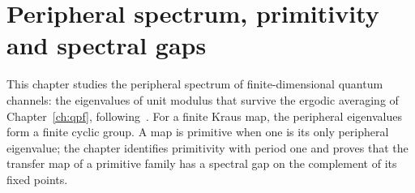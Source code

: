 
\chapter{Peripheral spectrum, primitivity and spectral gaps}
\label{ch:spectral}

This chapter studies the peripheral spectrum of finite-dimensional quantum
channels: the eigenvalues of unit modulus that survive the ergodic averaging
of Chapter~\ref{ch:qpf}, following~\cite[Chapter~6]{Wolf2012Quantum}. For a
finite Kraus map, the peripheral eigenvalues form a finite cyclic group. A
map is primitive when one is its only peripheral eigenvalue; the chapter
identifies primitivity with period one and proves that the transfer map of a
primitive family has a spectral gap on the complement of its fixed points.





